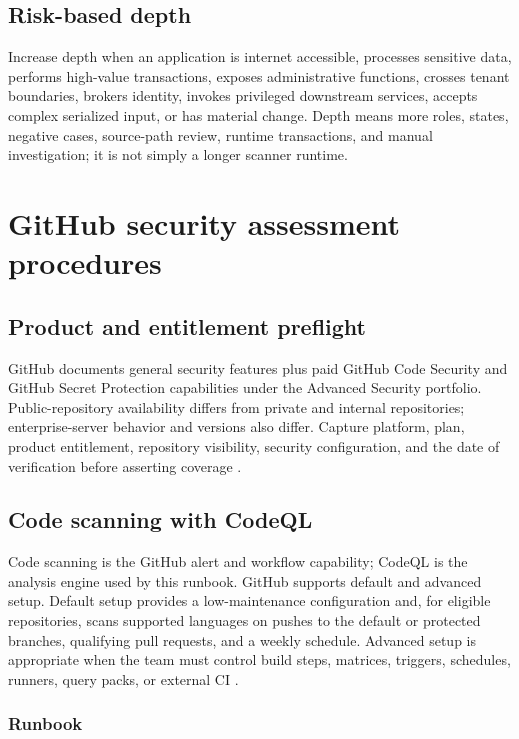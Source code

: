 \documentclass[11pt,letterpaper]{article}
\begin{document}
\subsection{Risk-based depth}

Increase depth when an application is internet accessible, processes sensitive data, performs high-value transactions, exposes administrative functions, crosses tenant boundaries, brokers identity, invokes privileged downstream services, accepts complex serialized input, or has material change. Depth means more roles, states, negative cases, source-path review, runtime transactions, and manual investigation; it is not simply a longer scanner runtime.

\section{GitHub security assessment procedures}

\subsection{Product and entitlement preflight}

GitHub documents general security features plus paid GitHub Code Security and GitHub Secret Protection capabilities under the Advanced Security portfolio. Public-repository availability differs from private and internal repositories; enterprise-server behavior and versions also differ. Capture platform, plan, product entitlement, repository visibility, security configuration, and the date of verification before asserting coverage \citep{githubfeatures}.

\subsection{Code scanning with CodeQL}

Code scanning is the GitHub alert and workflow capability; CodeQL is the analysis engine used by this runbook. GitHub supports default and advanced setup. Default setup provides a low-maintenance configuration and, for eligible repositories, scans supported languages on pushes to the default or protected branches, qualifying pull requests, and a weekly schedule. Advanced setup is appropriate when the team must control build steps, matrices, triggers, schedules, runners, query packs, or external CI \citep{githubcodesetup}.

\subsubsection{Runbook}
\end{document}
